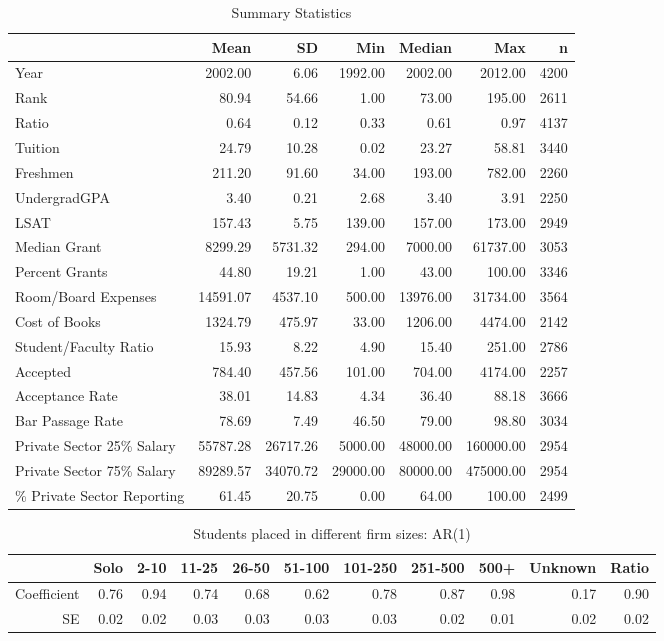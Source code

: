 \begin{table}[ht]
\centering
\begin{tabular}{lrrrrrr}
  \hline
 & Mean & SD & Min & Median & Max & n \\ 
  \hline
Year & 2002.00 & 6.06 & 1992.00 & 2002.00 & 2012.00 & 4200 \\ 
  Rank & 80.94 & 54.66 & 1.00 & 73.00 & 195.00 & 2611 \\ 
  Ratio & 0.64 & 0.12 & 0.33 & 0.61 & 0.97 & 4137 \\ 
  Tuition & 24.79 & 10.28 & 0.02 & 23.27 & 58.81 & 3440 \\ 
  Freshmen & 211.20 & 91.60 & 34.00 & 193.00 & 782.00 & 2260 \\ 
  UndergradGPA & 3.40 & 0.21 & 2.68 & 3.40 & 3.91 & 2250 \\ 
  LSAT & 157.43 & 5.75 & 139.00 & 157.00 & 173.00 & 2949 \\ 
  Median Grant & 8299.29 & 5731.32 & 294.00 & 7000.00 & 61737.00 & 3053 \\ 
  Percent Grants & 44.80 & 19.21 & 1.00 & 43.00 & 100.00 & 3346 \\ 
  Room/Board Expenses & 14591.07 & 4537.10 & 500.00 & 13976.00 & 31734.00 & 3564 \\ 
  Cost of Books & 1324.79 & 475.97 & 33.00 & 1206.00 & 4474.00 & 2142 \\ 
  Student/Faculty Ratio & 15.93 & 8.22 & 4.90 & 15.40 & 251.00 & 2786 \\ 
  Accepted & 784.40 & 457.56 & 101.00 & 704.00 & 4174.00 & 2257 \\ 
  Acceptance Rate & 38.01 & 14.83 & 4.34 & 36.40 & 88.18 & 3666 \\ 
  Bar Passage Rate & 78.69 & 7.49 & 46.50 & 79.00 & 98.80 & 3034 \\ 
  Private Sector 25\% Salary & 55787.28 & 26717.26 & 5000.00 & 48000.00 & 160000.00 & 2954 \\ 
  Private Sector 75\% Salary & 89289.57 & 34070.72 & 29000.00 & 80000.00 & 475000.00 & 2954 \\ 
  \% Private Sector Reporting & 61.45 & 20.75 & 0.00 & 64.00 & 100.00 & 2499 \\ 
   \hline
\end{tabular}
\caption{Summary Statistics} 
\label{tab:summary}
\end{table}
\clearpage%
\begin{table}[ht]
\centering
\begin{tabular}{rrrrrrrrrrr}
  \hline
 & Solo & 2-10 & 11-25 & 26-50 & 51-100 & 101-250 & 251-500 & 500+ & Unknown & Ratio \\ 
  \hline
Coefficient & 0.76 & 0.94 & 0.74 & 0.68 & 0.62 & 0.78 & 0.87 & 0.98 & 0.17 & 0.90 \\ 
  SE & 0.02 & 0.02 & 0.03 & 0.03 & 0.03 & 0.03 & 0.02 & 0.01 & 0.02 & 0.02 \\ 
   \hline
\end{tabular}
\caption{Students placed in different firm sizes: AR(1)} 
\label{tab:placement}
\end{table}
